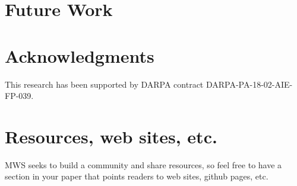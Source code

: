 \documentclass[11pt]{article}
\begin{document}
\section{Future Work}

\section{Acknowledgments}

This research has been supported by DARPA contract DARPA-PA-18-02-AIE-FP-039.

\section{Resources, web sites, etc.}

MWS seeks to build a community and share resources, so feel free to have a section in your paper that points readers to web sites, github pages, etc.



\end{document}
